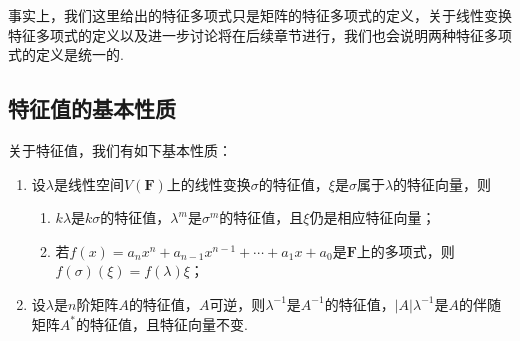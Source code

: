 事实上，我们这里给出的特征多项式只是矩阵的特征多项式的定义，关于线性变换特征多项式的定义以及进一步讨论将在后续章节进行，我们也会说明两种特征多项式的定义是统一的.

\subsection{特征值的基本性质}

关于特征值，我们有如下基本性质：
\begin{enumerate}
    \item 设$\lambda$是线性空间$V(\mathbf{F})$上的线性变换$\sigma$的特征值，$\xi$是$\sigma$属于$\lambda$的特征向量，则
          \begin{enumerate}
              \item $k\lambda$是$k\sigma$的特征值，$\lambda^m$是$\sigma^m$的特征值，且$\xi$仍是相应特征向量；

              \item 若$f(x)=a_nx^n+a_{n-1}x^{n-1}+\cdots+a_1x+a_0$是$\mathbf{F}$上的多项式，则$f(\sigma)(\xi)=f(\lambda)\xi$；
          \end{enumerate}

    \item 设$\lambda$是$n$阶矩阵$A$的特征值，$A$可逆，则$\lambda^{-1}$是$A^{-1}$的特征值，$|A|\lambda^{-1}$是$A$的伴随矩阵$A^*$的特征值，且特征向量不变.
\end{enumerate}

